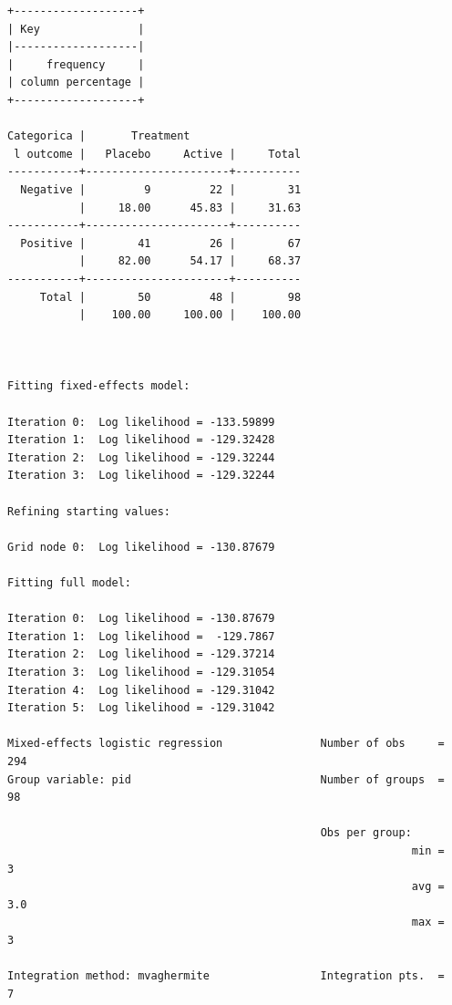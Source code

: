 \documentclass[
]{book}
\begin{document}
\begin{verbatim}
+-------------------+
| Key               |
|-------------------|
|     frequency     |
| column percentage |
+-------------------+

Categorica |       Treatment
 l outcome |   Placebo     Active |     Total
-----------+----------------------+----------
  Negative |         9         22 |        31 
           |     18.00      45.83 |     31.63 
-----------+----------------------+----------
  Positive |        41         26 |        67 
           |     82.00      54.17 |     68.37 
-----------+----------------------+----------
     Total |        50         48 |        98 
           |    100.00     100.00 |    100.00 



Fitting fixed-effects model:

Iteration 0:  Log likelihood = -133.59899  
Iteration 1:  Log likelihood = -129.32428  
Iteration 2:  Log likelihood = -129.32244  
Iteration 3:  Log likelihood = -129.32244  

Refining starting values:

Grid node 0:  Log likelihood = -130.87679

Fitting full model:

Iteration 0:  Log likelihood = -130.87679  
Iteration 1:  Log likelihood =  -129.7867  
Iteration 2:  Log likelihood = -129.37214  
Iteration 3:  Log likelihood = -129.31054  
Iteration 4:  Log likelihood = -129.31042  
Iteration 5:  Log likelihood = -129.31042  

Mixed-effects logistic regression               Number of obs     =        294
Group variable: pid                             Number of groups  =         98

                                                Obs per group:
                                                              min =          3
                                                              avg =        3.0
                                                              max =          3

Integration method: mvaghermite                 Integration pts.  =          7


\end{verbatim}
\end{document}
